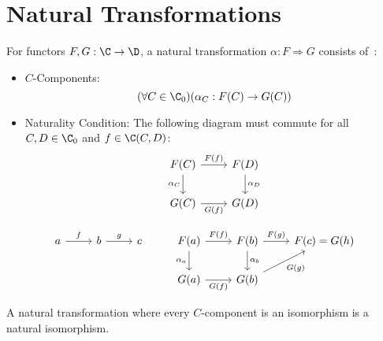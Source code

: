 \section{Natural Transformations}

\begin{definition}
  For functors $F, G:\C \to \D$, a natural transformation $\alpha : F
  \Rightarrow G$ consists of~\parencite[p.~28]{leinster:basic_category_theory}:
  \begin{itemize}
    \item $C$-Components:
      \[(\forall C\in \C_0)(\alpha_C : F(C) \to G(C))\]
    \item Naturality Condition: The following diagram must commute for all
      $C,D\in \C_0$ and $f \in \C(C, D)$:
      \[\begin{tikzcd}[ampersand replacement=\&]
        {F(C)} \& {F(D)} \\
        {G(C)} \& {G(D)}
        \arrow["{\alpha_C}"', from=1-1, to=2-1]
        \arrow["{\alpha_{D}}", from=1-2, to=2-2]
        \arrow["{F(f)}", from=1-1, to=1-2]
        \arrow["{G(f)}"', from=2-1, to=2-2]
      \end{tikzcd}\]
  \end{itemize}
\end{definition}

\begin{example}
  \[\begin{tikzcd}[ampersand replacement=\&]
    a \& b \& c \& {F(a)} \& {F(b)} \& {F(c)=G(h)} \\
    \&\&\& {G(a)} \& {G(b)}
    \arrow["{\alpha_a}"', from=1-4, to=2-4]
    \arrow["{\alpha_b}", from=1-5, to=2-5]
    \arrow["{F(f)}", from=1-4, to=1-5]
    \arrow["{G(f)}"', from=2-4, to=2-5]
    \arrow["f", from=1-1, to=1-2]
    \arrow["g", from=1-2, to=1-3]
    \arrow["{F(g)}", from=1-5, to=1-6]
    \arrow["{G(g)}"', from=2-5, to=1-6]
  \end{tikzcd}\]
\end{example}

\begin{remark}
  A natural transformation where every $C$-component is an isomorphism is a
  natural isomorphism.
\end{remark}





